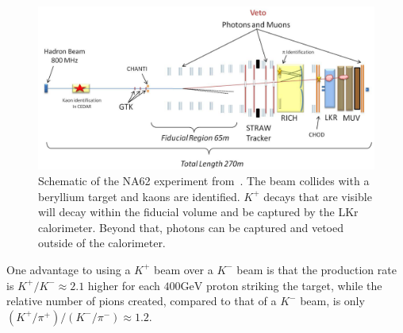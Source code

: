 \begin{figure}[h]
    \centering
    \includegraphics[width=\textwidth]{Figures/experiments/na62_schematic}
    \caption{Schematic of the NA62 experiment from~\cite{Martellotti:2015kna}. The beam collides with a beryllium target and kaons are identified. $K^+$ decays that are visible will decay within the fiducial volume and be captured by the LKr calorimeter. Beyond that, photons can be captured and vetoed outside of the calorimeter.}
    \label{fig:na62_experiment}
\end{figure}

One advantage to using a $K^+$ beam over a $K^-$ beam is that the production rate is $K^+ / K^- \approx 2.1$ higher for each $400\textrm{GeV}$ proton striking the target, while the relative number of pions created, compared to that of a $K^-$ beam, is only $(K^+ / \pi^+) / (K^- / \pi^-) \approx 1.2$.
